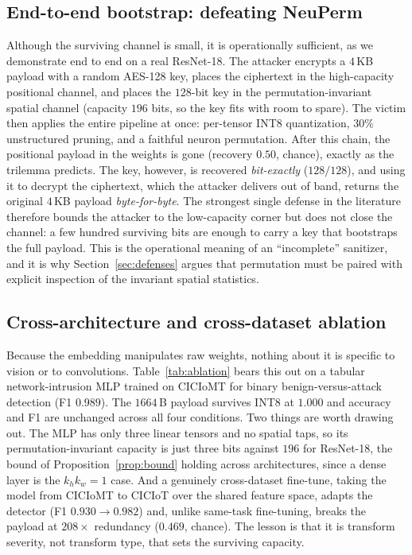 \documentclass[a4paper,fleqn]{cas-dc}
\theoremstyle{plain}
\theoremstyle{remark}
\begin{document}
\subsection{End-to-end bootstrap: defeating NeuPerm}\label{sec:bootstrap}
Although the surviving channel is small, it is operationally sufficient, as we
demonstrate end to end on a real ResNet-18. The
attacker encrypts a $4$\,KB payload with a random AES-128 key, places the ciphertext in
the high-capacity positional channel, and places the $128$-bit key in the
permutation-invariant spatial channel (capacity $196$ bits, so the key fits with room to
spare). The victim then applies the entire pipeline at once: per-tensor INT8
quantization, $30\%$ unstructured pruning, and a faithful neuron permutation. After this
chain, the positional payload in the weights is gone (recovery $0.50$, chance), exactly
as the trilemma predicts. The key, however, is recovered \emph{bit-exactly}
($128/128$), and using it to decrypt the ciphertext, which the attacker delivers out of
band, returns the original $4$\,KB payload \emph{byte-for-byte}. The strongest single
defense in the literature therefore bounds the attacker to the low-capacity corner but
does not close the channel: a few hundred surviving bits are enough to carry a key that
bootstraps the full payload. This is the operational meaning of an ``incomplete''
sanitizer, and it is why Section~\ref{sec:defenses} argues that permutation must be
paired with explicit inspection of the invariant spatial statistics.

\subsection{Cross-architecture and cross-dataset ablation}\label{sec:ablation}
Because the embedding manipulates raw weights, nothing about it is specific to vision
or to convolutions. Table~\ref{tab:ablation} bears this out on a tabular
network-intrusion MLP trained on CICIoMT \cite{dadkhah2024ciciomt2024} for binary
benign-versus-attack detection (F1 $0.989$). The $1664$\,B payload survives INT8 at
$1.000$ and accuracy and F1 are unchanged across all four conditions. Two things are
worth drawing out. The MLP has only three linear tensors and no spatial taps, so its
permutation-invariant capacity is just three bits against $196$ for ResNet-18, the
bound of Proposition~\ref{prop:bound} holding across architectures, since a dense layer
is the $k_h k_w=1$ case. And a genuinely cross-dataset fine-tune, taking the model from
CICIoMT to CICIoT \cite{neto2023ciciot2023} over the shared feature space, adapts the
detector (F1 $0.930\!\to\!0.982$) and, unlike same-task fine-tuning, breaks the payload
at $208\times$ redundancy ($0.469$, chance). The lesson is that it is transform
severity, not transform type, that sets the surviving capacity.
\end{document}

